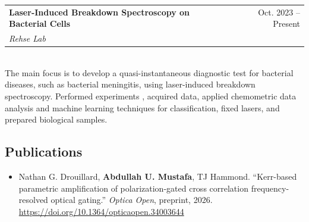 \documentclass[11pt]{article}
\makeatletter
\newcommand{\activity}[3]{
	\begin{tabular*}{\textwidth}{l@{\extracolsep{\fill}}r}
		\textbf{#1} & #3 \\
		\textit{#2} & \\
\end{tabular*} \\}
\makeatother
\begin{document}
\activity{Laser-Induced Breakdown Spectroscopy on Bacterial Cells}{Rehse Lab}{Oct. 2023 -- Present}
The main focus is to develop a quasi-instantaneous diagnostic test for bacterial diseases, such as bacterial meningitis, using laser-induced breakdown spectroscopy. Performed experiments , acquired data, applied chemometric data analysis and machine learning techniques for classification, fixed lasers, and prepared biological samples.

\subsection*{Publications}
\begin{itemize}
	\item Nathan G. Drouillard, \textbf{Abdullah U. Mustafa}, TJ Hammond. ``Kerr-based parametric amplification of polarization-gated cross correlation frequency-resolved optical gating.'' \textit{Optica Open}, preprint, 2026. \url{https://doi.org/10.1364/opticaopen.34003644}
\end{itemize}
\end{document}

